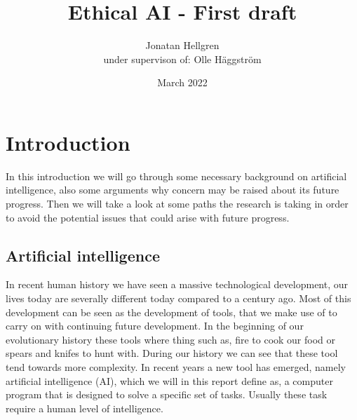 \documentclass[12pt,A4]{report}
\title{Ethical AI - First draft}
\author{Jonatan Hellgren\\
under supervison of: Olle Häggström}
\date{March 2022}
\theoremstyle{definition}
\begin{document}
\maketitle


\thispagestyle{empty}

\newpage
{}

\tableofcontents

\newpage
{}


\chapter{Introduction}
In this introduction we will go through some necessary background on artificial intelligence, also some arguments why concern may be raised about its future progress. Then we will take a look at some paths the research is taking in order to avoid the potential issues that could arise with future progress. 

\section{Artificial intelligence}

In recent human history we have seen a massive technological development, our lives today are severally different today compared to a century ago. Most of this development can be seen as the development of tools, that we make use of to carry on with continuing future development. In the beginning of our evolutionary history these tools where thing such as, fire to cook our food or spears and knifes to hunt with. During our history we can see that these tool tend towards more complexity. In recent years a new tool has emerged, namely artificial intelligence (AI), which we will in this report define as, a computer program that is designed to solve a specific set of tasks. Usually these task require a human level of intelligence.
\end{document}

